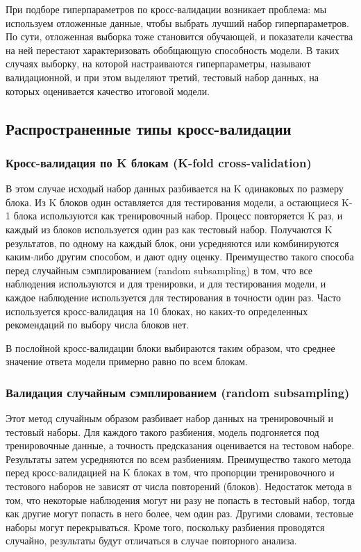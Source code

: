 \documentclass[a4paper, 12pt]{article}
\theoremstyle{plain} %
\theoremstyle{definition} %
\theoremstyle{remark} %
\begin{document}
	При подборе гиперпараметров по кросс-валидации возникает проблема:
	мы используем отложенные данные, чтобы выбрать лучший набор гиперпараметров.
	По сути, отложенная выборка тоже становится обучающей, и показатели качества на ней
	перестают характеризовать обобщающую способность модели.
	В таких случаях выборку, на которой настраиваются гиперпараметры,
	называют валидационной, и при этом выделяют третий, тестовый набор данных,
	на которых оценивается качество итоговой модели.

\subsection{Распространенные типы кросс-валидации}

\subsubsection{Кросс-валидация по K блокам (K-fold cross-validation)}

В этом случае исходый набор данных разбивается на K одинаковых по размеру блока. Из K блоков один оставляется для тестирования модели, а остающиеся K-1 блока используются как тренировочный набор. Процесс повторяется K раз, и каждый из блоков используется один раз как тестовый набор. Получаются K результатов, по одному на каждый блок, они усредняются или комбинируются каким-либо другим способом, и дают одну оценку. Преимущество такого способа перед случайным сэмплированием (random subsampling) в том, что все наблюдения используются и для тренировки, и для тестирования модели, и каждое наблюдение используется для тестирования в точности один раз. Часто используется кросс-валидация на 10 блоках, но каких-то определенных рекомендаций по выбору числа блоков нет.

В послойной кросс-валидации блоки выбираются таким образом, что среднее значение ответа модели примерно равно по всем блокам.

\subsubsection{Валидация случайным сэмплированием (random subsampling)}

Этот метод случайным образом разбивает набор данных на тренировочный и тестовый наборы. Для каждого такого разбиения, модель подгоняется под тренировочные данные, а точность предсказания оценивается на тестовом наборе. Результаты затем усредняются по всем разбиениям. Преимущество такого метода перед кросс-валидацией на K блоках в том, что пропорции тренировочного и тестового наборов не зависят от числа повторений (блоков). Недостаток метода в том, что некоторые наблюдения могут ни разу не попасть в тестовый набор, тогда как другие могут попасть в него более, чем один раз. Другими словами, тестовые наборы могут перекрываться. Кроме того, поскольку разбиения проводятся случайно, результаты будут отличаться в случае повторного анализа.
\end{document}
